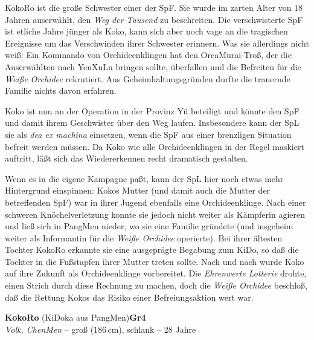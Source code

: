 \documentclass[
a4paper,
twoside,
DIV=calc,
BCOR=4mm,
fontsize=9pt,
twocolumn=on,
titlepage=on,
parskip=half
]{scrartcl}
\begin{document}
KokoRo ist die große Schwester einer der SpF. Sie wurde im zarten
Alter von 18 Jahren auserwählt, den \emph{Weg der Tausend} zu
beschreiten. Die verschwisterte SpF ist etliche Jahre jünger als Koko,
kann sich aber noch vage an die tragischen Ereignisse um das
Verschwinden ihrer Schwester erinnern. Was sie allerdings nicht weiß:
Ein Kommando von Orchideenklingen hat den OrcaMurai-Troß, der die
Auserwählten nach YenXuLu bringen sollte, überfallen und die Befreiten
für die \emph{Weiße Orchidee} rekrutiert. Aus Geheimhaltungsgründen
durfte die trauernde Familie nichts davon erfahren.

Koko ist nun an der Operation in der Provinz Yü beteiligt und könnte
den SpF und damit ihrem Geschwister über den Weg laufen. Insbesondere
kann der SpL sie als \emph{dea ex machina} einsetzen, wenn die SpF aus
einer brenzligen Situation befreit werden müssen. Da Koko wie alle
Orchideenklingen in der Regel maskiert auftritt, läßt sich das
Wiedererkennen recht dramatisch gestalten.

{\small Wenn es in die eigene Kampagne paßt, kann der SpL hier noch
  etwas mehr Hintergrund einspinnen: Kokos Mutter (und damit auch die
  Mutter der betreffenden SpF) war in ihrer Jugend ebenfalls eine
  Orchideenklinge. Nach einer schweren Knöchelverletzung konnte sie
  jedoch nicht weiter als Kämpferin agieren und ließ sich in PangMen
  nieder, wo sie eine Familie gründete (und insgeheim weiter als
  Informantin für die \emph{Weiße Orchidee} operierte). Bei ihrer
  ältesten Tochter KokoRo erkannte sie eine ausgeprägte Begabung zum
  KiDo, so daß die Tochter in die Fußstapfen ihrer Mutter treten
  sollte. Nach und nach wurde Koko auf ihre Zukunft als Orchideenklinge
  vorbereitet. Die \emph{Ehrenwerte Lotterie} drohte, einen Strich
  durch diese Rechnung zu machen, doch die \emph{Weiße Orchidee}
  beschloß, daß die Rettung Kokos das Risiko einer Befreiungsaktion
  wert war.}

\textbf{KokoRo} (KiDoka aus PangMen)\hfill \textbf{Gr4}\\
\emph{Volk, ChenMen} -- groß (186\,cm), schlank -- 28 Jahre

\end{document}
